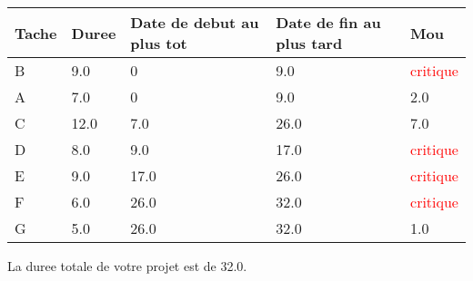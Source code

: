 \documentclass{article}
\begin{document}
\begin{tabular}{|l|l|l|l|l|}
\hline 
Tache & Duree & Date de debut au plus tot & Date de fin au plus tard & Mou\tabularnewline
\hline

B&9.0&0&9.0&\textcolor{red}{critique}\tabularnewline
\hline
A&7.0&0&9.0&2.0\tabularnewline
\hline
C&12.0&7.0&26.0&7.0\tabularnewline
\hline
D&8.0&9.0&17.0&\textcolor{red}{critique}\tabularnewline
\hline
E&9.0&17.0&26.0&\textcolor{red}{critique}\tabularnewline
\hline
F&6.0&26.0&32.0&\textcolor{red}{critique}\tabularnewline
\hline
G&5.0&26.0&32.0&1.0\tabularnewline
\hline

\end{tabular}
La duree totale de votre projet est de 32.0.
\end{document}
